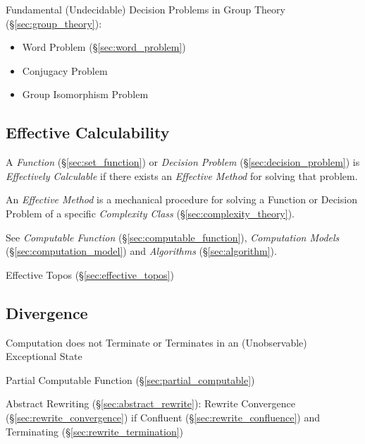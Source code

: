 Fundamental (Undecidable) Decision Problems in Group Theory (\S\ref{sec:group_theory}):
\begin{itemize}
  \item Word Problem (\S\ref{sec:word_problem})
  \item Conjugacy Problem
  \item Group Isomorphism Problem
\end{itemize}



\subsection{Effective Calculability}\label{sec:effective_method}

A \emph{Function} (\S\ref{sec:set_function}) or \emph{Decision
  Problem} (\S\ref{sec:decision_problem}) is \emph{Effectively
  Calculable} if there exists an \emph{Effective Method} for solving
that problem.

An \emph{Effective Method} is a mechanical procedure for solving a
Function or Decision Problem of a specific \emph{Complexity Class}
(\S\ref{sec:complexity_theory}).

See \emph{Computable Function} (\S\ref{sec:computable_function}),
\emph{Computation Models} (\S\ref{sec:computation_model}) and
\emph{Algorithms} (\S\ref{sec:algorithm}).

Effective Topos (\S\ref{sec:effective_topos})



\subsection{Divergence}\label{sec:computation_divergence}

Computation does not Terminate or Terminates in an (Unobservable)
Exceptional State

Partial Computable Function (\S\ref{sec:partial_computable})

Abstract Rewriting (\S\ref{sec:abstract_rewrite}): Rewrite Convergence
(\S\ref{sec:rewrite_convergence}) if Confluent
(\S\ref{sec:rewrite_confluence}) and Terminating
(\S\ref{sec:rewrite_termination})

